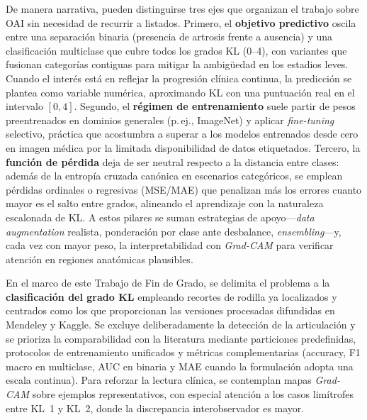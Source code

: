 \documentclass[11pt,spanish,listoffigures,listoftables]{tfgetsinf}
\begin{document}
De manera narrativa, pueden distinguirse tres ejes que organizan el trabajo
sobre OAI sin necesidad de recurrir a listados. Primero, el \textbf{objetivo
	predictivo} oscila entre una separación binaria (presencia de artrosis frente a
ausencia) y una clasificación multiclase que cubre todos los grados KL (0--4),
con variantes que fusionan categorías contiguas para mitigar la ambigüedad en
los estadios leves. Cuando el interés está en reflejar la progresión clínica
continua, la predicción se plantea como variable numérica, aproximando KL con
una puntuación real en el intervalo $[0,4]$. Segundo, el \textbf{régimen de
	entrenamiento} suele partir de pesos preentrenados en dominios generales
(p.\,ej., ImageNet) y aplicar \emph{fine-tuning} selectivo, práctica que
acostumbra a superar a los modelos entrenados desde cero en imagen médica por
la limitada disponibilidad de datos etiquetados. Tercero, la \textbf{función de
	pérdida} deja de ser neutral respecto a la distancia entre clases: además de la
entropía cruzada canónica en escenarios categóricos, se emplean pérdidas
ordinales o regresivas (MSE/MAE) que penalizan más los errores cuanto mayor es
el salto entre grados, alineando el aprendizaje con la naturaleza escalonada de
KL. A estos pilares se suman estrategias de apoyo—\emph{data augmentation}
realista, ponderación por clase ante desbalance, \emph{ensembling}—y, cada vez
con mayor peso, la interpretabilidad con \emph{Grad-CAM} para verificar
atención en regiones anatómicas plausibles.

En el marco de este Trabajo de Fin de Grado, se delimita el problema a la
\textbf{clasificación del grado KL} empleando recortes de rodilla ya
localizados y centrados como los que proporcionan las versiones procesadas
difundidas en Mendeley y Kaggle. Se excluye deliberadamente la detección de la
articulación y se prioriza la comparabilidad con la literatura mediante
particiones predefinidas, protocolos de entrenamiento unificados y métricas
complementarias (accuracy, F1 macro en multiclase, AUC en binaria y MAE cuando
la formulación adopta una escala continua). Para reforzar la lectura clínica,
se contemplan mapas \emph{Grad-CAM} sobre ejemplos representativos, con
especial atención a los casos limítrofes entre KL~1 y KL~2, donde la
discrepancia interobservador es mayor.
\end{document}
